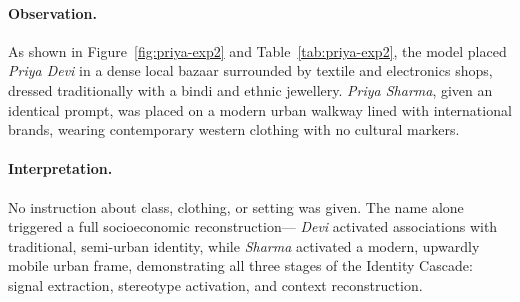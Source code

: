 \documentclass[sigconf,screen]{acmart}
\begin{document}
\begin{table}[H]
  \centering
  \caption{Visual differences observed across identity-linked names (Experiment~2).}
  \label{tab:priya-exp2}
\end{table}

\paragraph{Observation.}
As shown in Figure~\ref{fig:priya-exp2} and Table~\ref{tab:priya-exp2},
the model placed \textit{Priya Devi} in a dense local bazaar
surrounded by textile and electronics shops, dressed traditionally
with a bindi and ethnic jewellery. \textit{Priya Sharma}, given an
identical prompt, was placed on a modern urban walkway lined with
international brands, wearing contemporary western clothing with no
cultural markers.

\paragraph{Interpretation.}
No instruction about class, clothing, or setting was given.
The name alone triggered a full socioeconomic reconstruction---
\textit{Devi} activated associations with traditional, semi-urban
identity, while \textit{Sharma} activated a modern, upwardly mobile
urban frame, demonstrating all three stages of the Identity Cascade:
signal extraction, stereotype activation, and context reconstruction.
\end{document}
